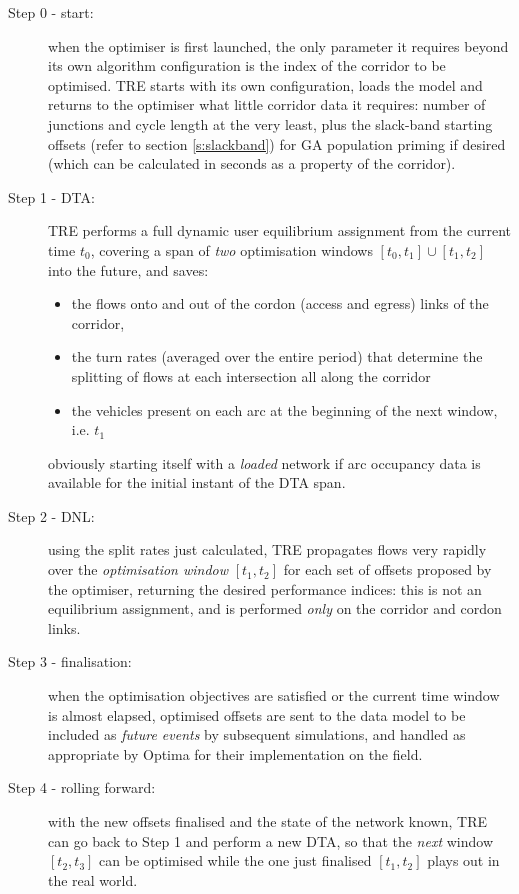 \begin{description}
\item[Step 0 - start:] when the optimiser is first launched, the only parameter it requires beyond its own algorithm configuration is the index of the corridor to be optimised. TRE starts with its own configuration, loads the model and returns to the optimiser what little corridor data it requires: number of junctions and cycle length at the very least, plus the slack-band starting offsets (refer to section \ref{s:slackband}) for GA population priming if desired (which can be calculated in seconds as a property of the corridor).
\item[Step 1 - DTA:] TRE performs a full dynamic user equilibrium assignment from the current time $t_0$, covering a span of \emph{two} optimisation windows $[t_0,t_1]\cup[t_1, t_2]$ into the future, and saves:
\begin{itemize}
\item the flows onto and out of the cordon (access and egress) links of the corridor,
\item the turn rates (averaged over the entire period) that determine the splitting of flows at each intersection all along the corridor
\item the vehicles present on each arc at the beginning of the next window, i.e. $t_1$
\end{itemize}
obviously starting itself with a \emph{loaded} network if arc occupancy data is available for the initial instant of the DTA span.
\item[Step 2 - DNL:] using the split rates just calculated, TRE propagates flows very rapidly over the \emph{optimisation window} $[t_1,t_2]$ for each set of offsets proposed by the optimiser, returning the desired performance indices: this is not an equilibrium assignment, and is performed \emph{only} on the corridor and cordon links.
\item[Step 3 - finalisation:] when the optimisation objectives are satisfied or the current time window is almost elapsed, optimised offsets are sent to the data model to be included as \emph{future events} by subsequent simulations, and handled as appropriate by Optima for their implementation on the field.
\item[Step 4 - rolling forward:] with the new offsets finalised and the state of the network known, TRE can go back to Step 1 and perform a new DTA, so that the \emph{next} window $[t_2,t_3]$ can be optimised while the one just finalised $[t_1,t_2]$ plays out in the real world.
\end{description}

